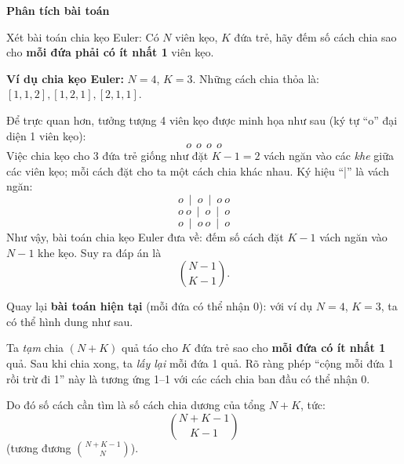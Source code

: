 \textbf{Phân tích bài toán}

Xét bài toán chia kẹo Euler: Có $N$ viên kẹo, $K$ đứa trẻ, hãy đếm số cách chia sao cho \textbf{mỗi đứa phải có ít nhất 1} viên kẹo.

\textbf{Ví dụ chia kẹo Euler:} $N=4$, $K=3$. Những cách chia thỏa là: $[1,1,2], [1,2,1], [2,1,1]$.

Để trực quan hơn, tưởng tượng 4 viên kẹo được minh họa như sau (ký tự ``o'' đại diện 1 viên kẹo):
\[
o\ \ o\ \ o\ \ o
\]
Việc chia kẹo cho 3 đứa trẻ giống như đặt $K-1=2$ vách ngăn vào các \emph{khe} giữa các viên kẹo; mỗi cách đặt cho ta một cách chia khác nhau. Ký hiệu ``|'' là vách ngăn:
\[
o\ \mid\ o\ \mid\ o\ o
\]
\[
o\ o\ \mid\ o\ \mid\ o
\]
\[
o\ \mid\ o\ o\ \mid\ o
\]
Như vậy, bài toán chia kẹo Euler đưa về: đếm số cách đặt $K-1$ vách ngăn vào $N-1$ khe kẹo. Suy ra đáp án là
\[
\binom{N-1}{K-1}.
\]

\medskip
Quay lại \textbf{bài toán hiện tại} (mỗi đứa có thể nhận $0$): với ví dụ $N=4$, $K=3$, ta có thể hình dung như sau.

Ta \emph{tạm} chia $(N+K)$ quả táo cho $K$ đứa trẻ sao cho \textbf{mỗi đứa có ít nhất 1} quả. Sau khi chia xong, ta \emph{lấy lại} mỗi đứa 1 quả. Rõ ràng phép “cộng mỗi đứa 1 rồi trừ đi 1” này là tương ứng 1–1 với các cách chia ban đầu có thể nhận $0$.

Do đó số cách cần tìm là số cách chia dương của tổng $N+K$, tức:
\[
\binom{N+K-1}{K-1}
\]
(tương đương \(\binom{N+K-1}{N}\)).


\begin{lstlisting}[title=\centering \textbf{Cài đặt}]
\end{lstlisting}
